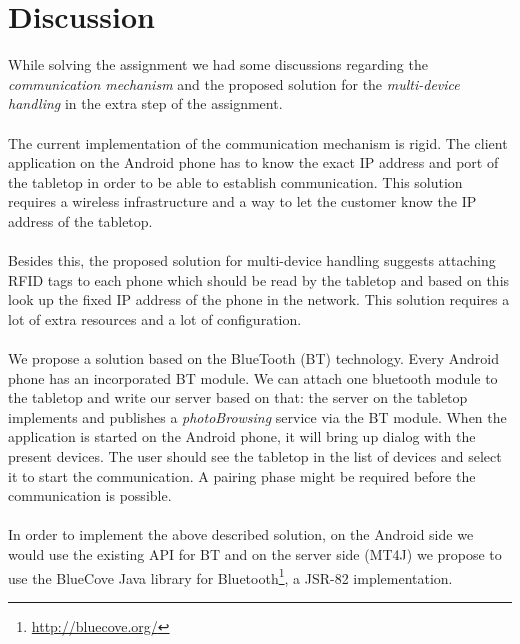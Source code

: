 \section{Discussion}
\label{sec.discussion}
While solving the assignment we had some discussions regarding the
\emph{communication mechanism} and the proposed solution for the
\emph{multi-device handling} in the extra step of the assignment.\\ \\
The current implementation of the communication mechanism is rigid. The client
application on the Android phone has to know the exact IP address and port of the
tabletop in order to be able to establish communication. This solution requires
a wireless infrastructure and a way to let the customer
know the IP address of the tabletop.\\ \\
Besides this, the proposed solution for multi-device handling suggests attaching
RFID tags to each phone which should be read by the tabletop and based on this
look up the fixed IP address of the phone in the network. This solution requires
a lot of extra resources and a lot of configuration.\\ \\
We propose a solution based on the BlueTooth (BT) technology. Every Android
phone has an incorporated BT module. We can attach one bluetooth module to the
tabletop and write our server based on that: the server on the tabletop
implements and publishes a \emph{photoBrowsing} service via the BT module. When
the application is started on the Android phone, it will bring up dialog with
the present devices. The user should see the tabletop in the list of devices and
select it to start the communication. A pairing phase might be required before
the communication is possible.\\ \\
In order to implement the above described solution, on the Android side we would
use the existing API for BT and on the server side (MT4J) we propose to use the
BlueCove Java library for Bluetooth\footnote{\url{http://bluecove.org/}}, a
JSR-82 implementation.

